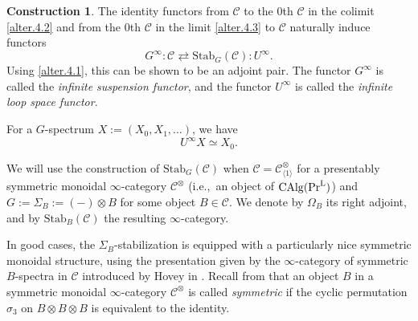 \documentclass[11pt, a4paper]{amsart}
\theoremstyle{definition}
\newtheorem{const}[thm]{Construction}
\numberwithin{equation}{subsection}
\newcommand{\Stab}{\mathrm{Stab}}
\newcommand{\cC}{\mathcal{C}}
\newcommand{\infC}{\mathcal{C}}
\begin{document}
\begin{const}
The identity functors from $\cC$ to the 0th $\cC$ in the colimit \eqref{alter.4.2} and from the 0th $\cC$ in the limit \eqref{alter.4.3} to $\cC$ naturally induce functors
\begin{equation}
G^\infty
:
\infC
\rightleftarrows
\Stab_G(\infC)
:
U^\infty.
\end{equation}
Using \eqref{alter.4.1}, this can be shown to be an adjoint pair.
The functor $G^\infty$ is called the \emph{infinite suspension functor}, and the functor $U^\infty$ is called the \emph{infinite loop space functor}.

For a $G$-spectrum $X:=(X_0,X_1,\ldots)$, we have 
\begin{equation}
U^\infty X\simeq X_0.
\end{equation}
\end{const}

We will use the construction of $\Stab_{G}(\infC)$ when $\infC = \infC_{\langle1\rangle}^{\otimes}$ for a presentably symmetric monoidal  $\infty$-category $\infC^\otimes$ (i.e.,~an object of $\mathrm{CAlg}(\Pr^{\rm L})$) and $G:=\Sigma_B:=(-)\otimes B$ for some object $B\in \infC$. We denote by $\Omega_B$ its right adjoint, and by $\Stab_B(\infC)$ the resulting $\infty$-category. 

In good cases, the $\Sigma_B$-stabilization is equipped with a particularly nice symmetric monoidal structure, using the presentation given by the $\infty$-category of symmetric $B$-spectra in $\infC$ introduced by Hovey in \cite{HoveySpectra}.  Recall  from \cite[Definition 2.16]{RobaloThesispublished} that an object $B$ in a symmetric monoidal $\infty$-category $\cC^\otimes$ is called \emph{symmetric} if the cyclic permutation $\sigma_3$ on $B\otimes B \otimes B$ is equivalent to the identity.
\end{document}
